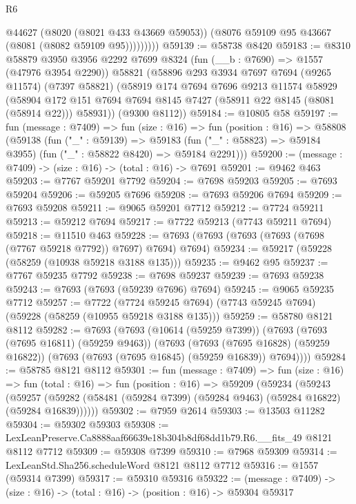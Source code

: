 \begin{lexlean}{R6}
\begin{coremodule}
                @44627
                (@8020 (@8021 @433 @43669 @59053))
                (@8076 @59109 @95 @43667 (@8081 (@8082 @59109 @95)))))))))
@59139 := @58738 @8420
@59183 := @8310
    @58879
    @3950
    @3956
    @2292
    @7699
    @8324
    (fun (__b : @7690) => @1557 (@47976 @3954 @2290))
    @58821
    (@58896
      @293
      @3934
      @7697
      @7694
      (@9265 @11574)
      (@7397 @58821)
      (@58919
        @174
        @7694
        @7696
        @9213
        @11574
        @58929
        (@58904 @172 @151 @7694 @7694 @8145 @7427 (@58911 @22 @8145 (@8081 (@58914 @22))) @58931))
      (@9300 @8112))
@59184 := @10805 @58
@59197 := fun (message : @7409) =>
  fun (size : @16) =>
  fun (position : @16) =>
  @58808
    (@59138
      (fun ("_" : @59139) =>
      @59183 (fun ("_" : @58823) => @59184 @3955) (fun ("_" : @58822 @8420) => @59184 @2291)))
@59200 := (message : @7409) -> (size : @16) -> (total : @16) -> @7691
@59201 := @9462 @463
@59203 := @7767 @59201 @7792
@59204 := @7698 @59203
@59205 := @7693 @59204
@59206 := @59205 @7696
@59208 := @7693 @59206 @7694
@59209 := @7693 @59208
@59211 := @9065 @59201 @7712
@59212 := @7724 @59211
@59213 := @59212 @7694
@59217 := @7722 @59213 (@7743 @59211 @7694)
@59218 := @11510 @463
@59228 := @7693 (@7693 (@7693 (@7693 (@7698 (@7767 @59218 @7792)) @7697) @7694) @7694)
@59234 := @59217 (@59228 (@58259 (@10938 @59218 @3188 @135)))
@59235 := @9462 @95
@59237 := @7767 @59235 @7792
@59238 := @7698 @59237
@59239 := @7693 @59238
@59243 := @7693 (@7693 (@59239 @7696) @7694)
@59245 := @9065 @59235 @7712
@59257 := @7722
    (@7724 @59245 @7694)
    (@7743 @59245 @7694)
    (@59228 (@58259 (@10955 @59218 @3188 @135)))
@59259 := @58780 @8121 @8112
@59282 := @7693
    (@7693
      (@10614 (@59259 @7399))
      (@7693
        (@7693 (@7695 @16811) (@59259 @9463))
        (@7693
          (@7693 (@7695 @16828) (@59259 @16822))
          (@7693 (@7693 (@7695 @16845) (@59259 @16839)) @7694))))
@59284 := @58785 @8121 @8112
@59301 := fun (message : @7409) =>
  fun (size : @16) =>
  fun (total : @16) =>
  fun (position : @16) =>
  @59209
    (@59234
      (@59243
        (@59257 (@59282 (@58481 (@59284 @7399) (@59284 @9463) (@59284 @16822) (@59284 @16839))))))
@59302 := @7959 @2614
@59303 := @13503 @11282
@59304 := @59302 @59303
@59308 := LexLeanPreserve.Ca8888aaf66639e18b304b8df68dd1b79.R6.__fits_49 @8121 @8112 @7712
@59309 := @59308 @7399
@59310 := @7968 @59309
@59314 := LexLeanStd.Sha256.scheduleWord @8121 @8112 @7712
@59316 := @1557 (@59314 @7399)
@59317 := @59310 @59316
@59322 := (message : @7409) -> (size : @16) -> (total : @16) -> (position : @16) -> @59304 @59317

\end{coremodule}
\end{lexlean}
